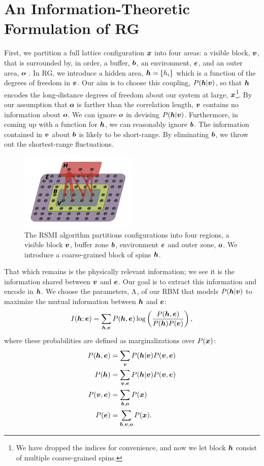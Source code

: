 \section{An Information-Theoretic Formulation of RG}
First, we partition a full lattice configuration $\boldsymbol{x}$ into four
areas: a visible block, $\boldsymbol{v}$, that is surrounded by, in order, a
buffer, $\boldsymbol{b}$, an environment, $\boldsymbol{e}$, and an outer area, $\boldsymbol{o}$
. In RG, we introduce a hidden area,
$\bh\eqcolon\{h_i\}$ which is a function of the degrees of freedom in
$\boldsymbol{v}$. Our aim is to choose this coupling, $P(\boldsymbol{h}\rvert\boldsymbol{v})$, so that
$\boldsymbol{h}$ encodes the long-distance degrees of freedom about our system at
large, $\boldsymbol{x}$\footnote{We have dropped the indices for convenience, and
  now we let block $\boldsymbol{h}$ consist of multiple coarse-grained
  spins.}. By our assumption that $\boldsymbol{o}$ is farther than the
correlation length, $\boldsymbol{v}$ contains no information about $\boldsymbol{o}$. We can
ignore $\boldsymbol{o}$ in devising $P(\boldsymbol{h}\rvert\boldsymbol{v})$. Furthermore, in coming up
with a function for $\boldsymbol{h}$, we can reasonably ignore $\boldsymbol{b}$. The
information contained in $\boldsymbol{v}$ about $\boldsymbol{b}$ is likely to be
short-range. By eliminating $\boldsymbol{b}$, we throw out the shortest-range
fluctuations.
\begin{figure}[ht]
  \centering \includegraphics[width=0.5\textwidth]{figures/kjr.png}
  \caption{The RSMI algorithm partitions configurations into four
    regions, a visible block $\boldsymbol{v}$, buffer zone $\boldsymbol{b}$, environment
    $\boldsymbol{e}$ and outer zone, $\boldsymbol{o}$. We introduce a coarse-grained block
    of spins $\boldsymbol{h}$.\label{fig:rsmi-overview} }
\end{figure}%
That which remains is the physically relevant information; we see it
is the information shared between $\boldsymbol{v}$ and $\boldsymbol{e}$. Our goal is to
extract this information and encode in $\boldsymbol{h}$. We choose the
parameters, $\Lambda$, of our RBM that models $P(\boldsymbol{h}\rvert\boldsymbol{v})$ to maximize
the mutual information between $\boldsymbol{h}$ and $\boldsymbol{e}$:%
\begin{equation}%
  I(\bh; \be)=\sum_{\bh,\be}P(\bh,\be)\log\left(\frac{P(\bh,\be)}{P(\bh)P(\be)}\right),\label{eq:rsmi}
\end{equation}%
where these probabilities are defined as marginalizations over
$P(\boldsymbol{x})$:%
\begin{align}%
  P(\bh, \be)&=\sum_{\bv}P(\bh\rvert \bv)P(\bv,\be)\\
  P(\bh)&=\sum_{\bv,\be}P(\bh\rvert \bv)P(\bv,\be)\\
  P(\bv,\be)&=\sum_{\bb,\bo}P(\bx)\\
  P(\be)&=\sum_{\bb,\bv,\bo}P(\bx).
\end{align}%

